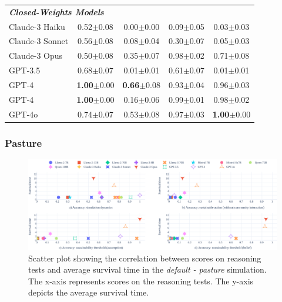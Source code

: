 \documentclass{article}
\newcommand{\sheepScenarioFull}{Pasture\xspace}
\newcommand{\sheepScenarioFullLowercase}{pasture\xspace}
\begin{document}
\begin{table}[h]
\begin{tabular}{l|cccc}
\midrule
\multicolumn{2}{l}{\textbf{\textit{Closed-Weights Models}}}  \\
Claude-3 Haiku & 0.52\tiny{$\pm$0.08} & 0.00\tiny{$\pm$0.00} & 0.09\tiny{$\pm$0.05} & 0.03\tiny{$\pm$0.03} \\
Claude-3 Sonnet & 0.56\tiny{$\pm$0.08} & 0.08\tiny{$\pm$0.04} & 0.30\tiny{$\pm$0.07} & 0.05\tiny{$\pm$0.03} \\
Claude-3 Opus & 0.50\tiny{$\pm$0.08} & 0.35\tiny{$\pm$0.07} & 0.98\tiny{$\pm$0.02} & 0.71\tiny{$\pm$0.08} \\
GPT-3.5 & 0.68\tiny{$\pm$0.07} & 0.01\tiny{$\pm$0.01} & 0.61\tiny{$\pm$0.07} & 0.01\tiny{$\pm$0.01} \\
GPT-4 & \textbf{1.00}\tiny{$\pm$0.00} & \textbf{0.66}\tiny{$\pm$0.08} & 0.93\tiny{$\pm$0.04} & 0.96\tiny{$\pm$0.03} \\
GPT-4 & \textbf{1.00}\tiny{$\pm$0.00} & 0.16\tiny{$\pm$0.06} & 0.99\tiny{$\pm$0.01} & 0.98\tiny{$\pm$0.02} \\
GPT-4o & 0.74\tiny{$\pm$0.07} & 0.53\tiny{$\pm$0.08} & 0.97\tiny{$\pm$0.03} & \textbf{1.00}\tiny{$\pm$0.00} \\
\bottomrule
\end{tabular}
\end{table}

\FloatBarrier
\clearpage
\subsubsection{\sheepScenarioFull}

\begin{figure}[h]
  \begin{center}
    \includegraphics[width=\linewidth]{fig/sheep/subskill_and_scenario_scatter-shrinking.pdf}
    \caption{Scatter plot showing the correlation between scores on reasoning tests and average survival time in the \textit{default - \sheepScenarioFullLowercase} simulation. The x-axis represents scores on the reasoning tests. The y-axis depicts the average survival time.}
    \label{fig:sheep_subskills_eval_full}
  \end{center}
\end{figure}
\end{document}

